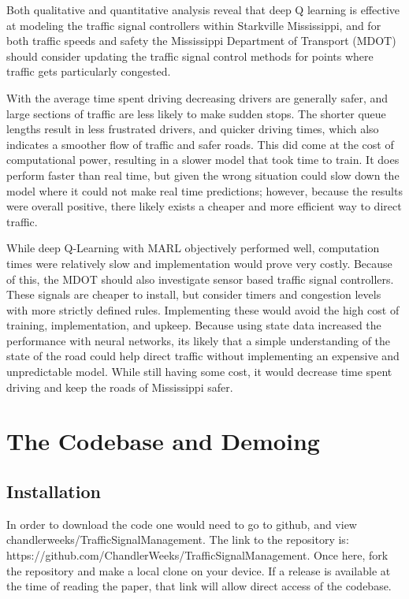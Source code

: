 \documentclass[conference]{IEEEtran}
\begin{document}
Both qualitative and quantitative analysis reveal that deep Q learning is effective at modeling the traffic signal controllers within Starkville Mississippi, and for both traffic speeds and safety the Mississippi Department of Transport (MDOT) should consider updating the traffic signal control methods for points where traffic gets particularly congested. 

With the average time spent driving decreasing drivers are generally safer, and large sections of traffic are less likely to make sudden stops. The shorter queue lengths result in less frustrated drivers, and quicker driving times, which also indicates a smoother flow of traffic and safer roads. This did come at the cost of computational power, resulting in a slower model that took time to train. It does perform faster than real time, but given the wrong situation could slow down the model where it could not make real time predictions; however, because the results were overall positive, there likely exists a cheaper and more efficient way to direct traffic. 

While deep Q-Learning with MARL objectively performed well, computation times were relatively slow and implementation would prove very costly. Because of this, the MDOT should also investigate sensor based traffic signal controllers. These signals are cheaper to install, but consider timers and congestion levels with more strictly defined rules. Implementing these would avoid the high cost of training, implementation, and upkeep. Because using state data increased the performance with neural networks, its likely that a simple understanding of the state of the road could help direct traffic without implementing an expensive and unpredictable model. While still having some cost, it would decrease time spent driving and keep the roads of Mississippi safer. 

\section{The Codebase and Demoing}

\subsection{Installation}

In order to download the code one would need to go to github, and view chandlerweeks/TrafficSignalManagement. The link to the repository is: https://github.com/ChandlerWeeks/TrafficSignalManagement. Once here, fork the repository and make a local clone on your device. If a release is available at the time of reading the paper, that link will allow direct access of the codebase. 
\end{document}
